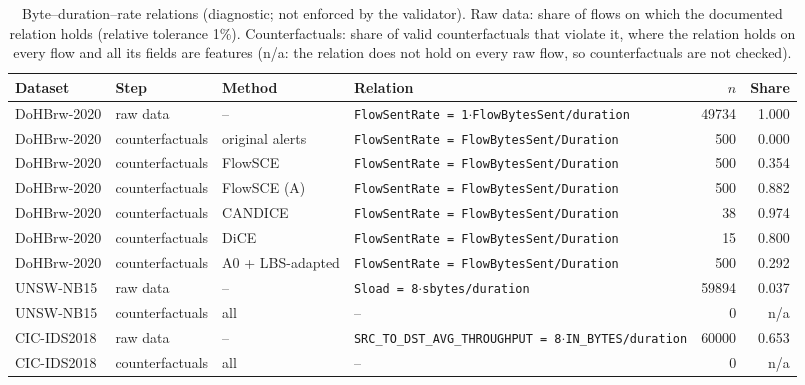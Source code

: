 \begin{table}[t]
\centering\footnotesize
\caption{Byte--duration--rate relations (diagnostic; not enforced by the validator). Raw data: share of flows on which the documented relation holds (relative tolerance 1\%). Counterfactuals: share of valid counterfactuals that violate it, where the relation holds on every flow and all its fields are features (n/a: the relation does not hold on every raw flow, so counterfactuals are not checked).}
\label{tab:a-domain}
\begin{tabular}{@{}llllrr@{}}
\toprule
Dataset & Step & Method & Relation & $n$ & Share \\
\midrule
DoHBrw-2020 & raw data & -- & \texttt{FlowSentRate = 1$\cdot$FlowBytesSent/duration} & 49734 & 1.000 \\
DoHBrw-2020 & counterfactuals & original alerts & \texttt{FlowSentRate = FlowBytesSent/Duration} & 500 & 0.000 \\
DoHBrw-2020 & counterfactuals & FlowSCE & \texttt{FlowSentRate = FlowBytesSent/Duration} & 500 & 0.354 \\
DoHBrw-2020 & counterfactuals & FlowSCE (A) & \texttt{FlowSentRate = FlowBytesSent/Duration} & 500 & 0.882 \\
DoHBrw-2020 & counterfactuals & CANDICE & \texttt{FlowSentRate = FlowBytesSent/Duration} & 38 & 0.974 \\
DoHBrw-2020 & counterfactuals & DiCE & \texttt{FlowSentRate = FlowBytesSent/Duration} & 15 & 0.800 \\
DoHBrw-2020 & counterfactuals & A0 + LBS-adapted & \texttt{FlowSentRate = FlowBytesSent/Duration} & 500 & 0.292 \\
UNSW-NB15 & raw data & -- & \texttt{Sload = 8$\cdot$sbytes/duration} & 59894 & 0.037 \\
UNSW-NB15 & counterfactuals & all & -- & 0 & n/a \\
CIC-IDS2018 & raw data & -- & \texttt{SRC\_TO\_DST\_AVG\_THROUGHPUT = 8$\cdot$IN\_BYTES/duration} & 60000 & 0.653 \\
CIC-IDS2018 & counterfactuals & all & -- & 0 & n/a \\
\bottomrule
\end{tabular}
\end{table}
